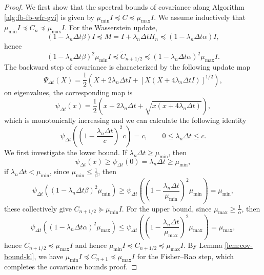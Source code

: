 \documentclass[11pt]{article}
\theoremstyle{plain}
\theoremstyle{definition}
\theoremstyle{remark}
\begin{document}
\begin{proof}
    We first show that the spectral bounds of covariance along Algorithm \ref{alg:fb-fb-wfr-gvi} is given by $\mu_{\min} I \preceq C \preceq \mu_{\max} I$. We assume inductively that $\mu_{\min} I \preceq C_n \preceq \mu_{\max} I$. For the Wasserstein update, 
    \begin{equation*}
        (1 - \lambda_n \Delta t \beta) I \preceq M = I + \lambda_n \Delta t H_n \preceq (1 - \lambda_n \Delta t \alpha) I,
    \end{equation*}
    hence
    \begin{equation*}
        (1 - \lambda_n \Delta t \beta)^2 \mu_{\min} I \preceq \widetilde C_{n+1/2} \preceq (1 - \lambda_n \Delta t \alpha)^2 \mu_{\max} I.
    \end{equation*}
    The backward step of covariance is characterized by the following update map
    \begin{equation*}
        \Psi_{\Delta t} (X) = \frac{1}{2} (X + 2 \lambda_n \Delta t I + [X (X + 4 \lambda_n \Delta t I)]^{1/2}),
    \end{equation*}
    on eigenvalues, the corresponding map is
    \begin{equation*}
        \psi_{\Delta t} (x) = \frac{1}{2} \left(x + 2 \lambda_n \Delta t + \sqrt{x (x + 4 \lambda_n \Delta t)} \right),
    \end{equation*}
    which is monotonically increasing and we can calculate the following identity
    \begin{equation*}
        \psi_{\Delta t} \left( \left(1 - \frac{\lambda_n \Delta t}{c}\right)^2 c \right) = c, \qquad 0 \leq \lambda_n \Delta t \leq c.
    \end{equation*}
    We first investigate the lower bound. If $\lambda_n \Delta t \geq \mu_{\min}$, then \begin{equation*}
        \psi_{\Delta t} (x) \geq \psi_{\Delta t} (0) = \lambda_n \Delta t \geq \mu_{\min},
    \end{equation*}
    if $\lambda_n \Delta t < \mu_{\min}$, since $\mu_{\min} \leq \frac{1}{\beta}$, then 
    $$\psi_{\Delta t} ((1 - \lambda_n \Delta t \beta)^2 \mu_{\min}) \geq \psi_{\Delta t} \left( \left(1 - \frac{\lambda_n \Delta t}{\mu_{\min}}\right)^2 \mu_{\min} \right) = \mu_{\min},$$
    these collectively give $C_{n+1/2} \succeq \mu_{\min} I$. For the upper bound, since $\mu_{\max} \geq \frac{1}{\alpha}$, then
    \begin{equation*}
        \psi_{\Delta t} ((1 - \lambda_n \Delta t \alpha)^2 \mu_{\max}) \leq \psi_{\Delta t} \left( \left( 1 - \frac{\lambda_n \Delta t}{\mu_{\max}} \right)^2 \mu_{\max} \right) = \mu_{\max},
    \end{equation*}
    hence $C_{n+1/2} \preceq \mu_{\max} I$ and hence $\mu_{\min} I \preceq C_{n+1/2} \preceq \mu_{\max} I$. By Lemma \ref{lem:cov-bound-kl}, we have $\mu_{\min} I \preceq C_{n+1} \preceq \mu_{\max} I$ for the Fisher--Rao step, which completes the covariance bounds proof.


\end{proof}
\end{document}
